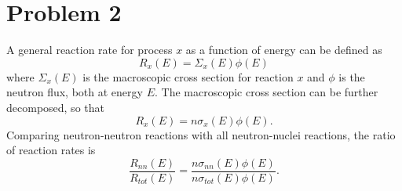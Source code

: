 \documentclass{article}
\begin{document}

\section*{Problem 2}

A general reaction rate for process $x$ as a function of energy can be defined as 
$$ R_x(E) = \Sigma_x(E) \phi(E) $$
where $\Sigma_x(E)$ is the macroscopic cross section for reaction $x$ and $\phi$ is the neutron flux, both at energy $E$. The macroscopic cross section can be further decomposed, so that
$$ R_x(E) = n \sigma_x(E) \phi(E) .$$
Comparing neutron-neutron reactions with all neutron-nuclei reactions, the ratio of reaction rates is
$$ \frac{R_{nn}(E)}{R_{tot}(E)} = \frac{n \sigma_{nn}(E) \phi(E)}{n \sigma_{tot}(E) \phi(E)} .$$
\end{document}
